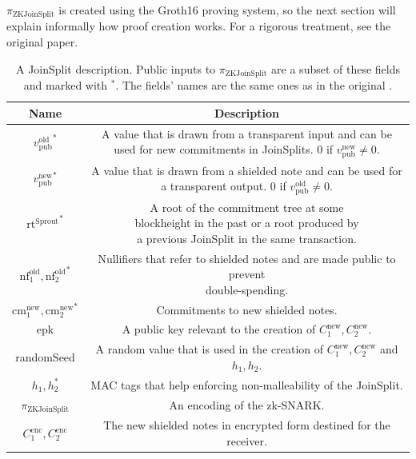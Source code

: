 \documentclass{article}
\begin{document}
$\pi_\text{ZKJoinSplit}$ is created using the Groth16 \cite{groth:zksnark} proving system, so the next section will explain informally how proof creation works.
For a rigorous treatment, see the original paper.

\begin{center}
\begin{table}
{\tiny
\begin{tabular}{ |c|c| } 
        \hline
        \textbf{Name} & \textbf{Description} \\
        \hline
        \rule{0pt}{4ex} {\small ${v_\text{pub}^\text{old}}^\ast$} & \makecell{A value that is drawn from a transparent input and can be used for new commitments\\ in JoinSplits. $0$ if $v_\text{pub}^\text{new} \neq 0$.} \\
        \hline
        \rule{0pt}{4ex} {\small ${v_\text{pub}^\text{new}}^\ast$} & \makecell{A value that is drawn from a shielded note and can be used for\\ a transparent output. $0$ if $v_\text{pub}^\text{old} \neq 0$.} \\
        \hline
        \rule{0pt}{4ex} {\small ${\text{rt}^\text{Sprout}}^\ast$} & \makecell{A root of the commitment tree at some \\ blockheight in the past or a root produced by\\ a previous JoinSplit in the same transaction.} \\
        \hline
        \rule{0pt}{4ex} {\small $\text{nf}_1^\text{old}, {\text{nf}_2^\text{old}}^\ast$} & \makecell{Nullifiers that refer to shielded notes and are made public to prevent\\ double-spending.} \\
        \hline
        \rule{0pt}{4ex} {\small $\text{cm}_1^\text{new}, {\text{cm}_2^\text{new}}^\ast$} & Commitments to new shielded notes. \\
        \hline
        \rule{0pt}{4ex} {\small epk} & A public key relevant to the creation of $C_1^\text{new}, C_2^\text{new}$. \\
        \hline
        \rule{0pt}{4ex} {\small randomSeed} & \makecell{A random value that is used in the creation of $C_1^\text{new}, C_2^\text{new}$ and\\ $h_1, h_2$.} \\
        \hline
        \rule{0pt}{4ex} {\small $h_1, h_2^\ast$} & MAC tags that help enforcing non-malleability of the JoinSplit. \\
        \hline
        \rule{0pt}{4ex} {\small $\pi_\text{ZKJoinSplit}$} & An encoding of the zk-SNARK. \\
        \hline
        \rule{0pt}{4ex} {\small $C_1^\text{enc}, C_2^\text{enc}$} & The new shielded notes in encrypted form destined for the receiver. \\
        \hline
\end{tabular}}
\caption{A JoinSplit description. Public inputs to $\pi_\text{ZKJoinSplit}$ are a subset of these fields and marked with $^\ast$. The fields' names are the same ones as in the original \protect\cite{hopwood:zcash}.} \label{fig:joinsplit}
\end{table}
\end{center}
\end{document}
